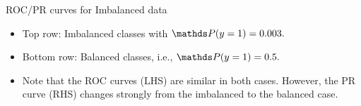 \documentclass[11pt,compress,t,notes=noshow, xcolor=table]{beamer}
\begin{document}
	
	\begin{vbframe}{ROC/PR curves for Imbalanced data}

			
			\small
			\vspace{-0.2cm}
			\begin{itemize}
				\item Top row: Imbalanced classes with $\P(y=1) = 0.003.$
				\item Bottom row: Balanced classes, i.e., $\P(y=1) = 0.5.$
				\item Note that the ROC curves (LHS) are similar in both cases. However, the PR curve (RHS) changes strongly from the imbalanced to the balanced case.
			\end{itemize}
			
		
		

\end{vbframe}
\end{document}
